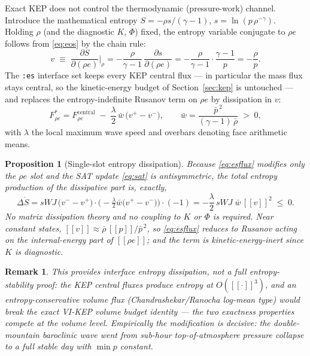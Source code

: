 \documentclass[11pt]{article}
\newcommand{\jump}[1]{[\![#1]\!]}
\newtheorem{prop}{Proposition}
\newtheorem{rem}{Remark}
\begin{document}
Exact KEP does not control the thermodynamic (pressure-work) channel.
Introduce the mathematical entropy
$S = -\rho s/(\gamma - 1)$, $s = \ln(p\,\rho^{-\gamma})$. Holding $\rho$
(and the diagnostic $K$, $\Phi$) fixed, the entropy variable conjugate to
$\rho e$ follows from \eqref{eq:eos} by the chain rule:
\begin{equation}
v \;\equiv\; \frac{\partial S}{\partial(\rho e)}\bigg|_{\rho}
= -\frac{\rho}{\gamma-1}\,\frac{\partial s}{\partial (\rho e)}
= -\frac{\rho}{\gamma-1}\cdot\frac{\gamma-1}{p}
= -\frac{\rho}{p}.
\end{equation}
The \texttt{:es} interface set keeps every KEP central flux --- in
particular the mass flux stays central, so the kinetic-energy budget of
Section~\ref{sec:kep} is untouched --- and replaces the
entropy-indefinite Rusanov term on $\rho e$ by dissipation in $v$:
\begin{equation}
F^*_{\rho e} = F^{\mathrm{central}}_{\rho e}
 \;-\; \frac{\lambda}{2}\,\bar w\,\big(v^+ - v^-\big),
\qquad
\bar w = \frac{\bar p^{\,2}}{(\gamma - 1)\,\bar\rho} \;>\; 0,
\label{eq:esflux}
\end{equation}
with $\lambda$ the local maximum wave speed and overbars denoting face
arithmetic means.

\begin{prop}[Single-slot entropy dissipation]
Because \eqref{eq:esflux} modifies only the $\rho e$ slot and the SAT
update \eqref{eq:sat} is antisymmetric, the total entropy production of
the dissipative part is, exactly,
\begin{equation}
\Delta \dot S
= s\!W\!J\,\big(v^- - v^+\big)\cdot
  \Big(-\tfrac{\lambda}{2}\bar w\big(v^+ - v^-\big)\Big)\cdot(-1)
= -\frac{\lambda}{2}\,s\!W\!J\;\bar w\,\jump{v}^2 \;\le\; 0 .
\end{equation}
No matrix dissipation theory and no coupling to $K$ or $\Phi$ is
required. Near constant states, $\jump{v} \approx \bar\rho\,\jump{p}/
\bar p^{\,2}$, so \eqref{eq:esflux} reduces to Rusanov acting on the
internal-energy part of $\jump{\rho e}$; and the term is
kinetic-energy-inert since $K$ is diagnostic.
\end{prop}

\begin{rem}
This provides interface entropy \emph{dissipation}, not a full
entropy-stability proof: the KEP central fluxes produce entropy at
$O(\jump{\cdot}^3)$, and an entropy-\emph{conservative} volume flux
(Chandrashekar/Ranocha log-mean type) would break the exact VI-KEP
volume budget identity --- the two exactness properties compete at the
volume level. Empirically the modification is decisive: the
double-mountain baroclinic wave went from sub-hour top-of-atmosphere
pressure collapse to a full stable day with $\min p$ constant.
\end{rem}
\end{document}
